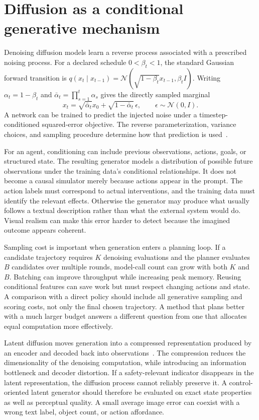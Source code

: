 \section{Diffusion as a conditional generative mechanism}
\label{sec:C06:diffusion}
Denoising diffusion models learn a reverse process associated with a prescribed noising process. For a declared schedule $0<\beta_t<1$, the standard Gaussian forward transition is $q(x_t\mid x_{t-1})=\mathcal N(\sqrt{1-\beta_t}x_{t-1},\beta_t I)$. Writing $\alpha_t=1-\beta_t$ and $\bar\alpha_t=\prod_{s=1}^t\alpha_s$ gives the directly sampled marginal
\begin{equation}
 x_t=\sqrt{\bar\alpha_t}x_0+
 \sqrt{1-\bar\alpha_t}\,\epsilon,
 \qquad\epsilon\sim\mathcal N(0,I).
\end{equation}
A network can be trained to predict the injected noise under a timestep-conditioned squared-error objective. The reverse parameterization, variance choices, and sampling procedure determine how that prediction is used~\cite{ho2020ddpm}.

For an agent, conditioning can include previous observations, actions, goals, or structured state. The resulting generator models a distribution of possible future observations under the training data's conditional relationships. It does not become a causal simulator merely because actions appear in the prompt. The action labels must correspond to actual interventions, and the training data must identify the relevant effects. Otherwise the generator may produce what usually follows a textual description rather than what the external system would do. Visual realism can make this error harder to detect because the imagined outcome appears coherent.

Sampling cost is important when generation enters a planning loop. If a candidate trajectory requires $K$ denoising evaluations and the planner evaluates $B$ candidates over multiple rounds, model-call count can grow with both $K$ and $B$. Batching can improve throughput while increasing peak memory. Reusing conditional features can save work but must respect changing actions and state. A comparison with a direct policy should include all generative sampling and scoring costs, not only the final chosen trajectory. A method that plans better with a much larger budget answers a different question from one that allocates equal computation more effectively.

Latent diffusion moves generation into a compressed representation produced by an encoder and decoded back into observations~\cite{rombach2021latentdiffusion}. The compression reduces the dimensionality of the denoising computation, while introducing an information bottleneck and decoder distortion. If a safety-relevant indicator disappears in the latent representation, the diffusion process cannot reliably preserve it. A control-oriented latent generator should therefore be evaluated on exact state properties as well as perceptual quality. A small average image error can coexist with a wrong text label, object count, or action affordance.

